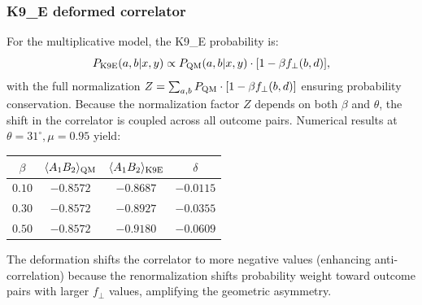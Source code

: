 \documentclass[12pt]{article}
\begin{document}
\subsubsection{K9\_E deformed correlator}
For the multiplicative model, the K9\_E probability is:
\begin{equation}
P_{\rm K9E}(a,b|x,y) \propto P_{\rm QM}(a,b|x,y) \cdot [1 - \beta f_\perp(b,d)],
\end{equation}
with the full normalization $Z = \sum_{a,b} P_{\rm QM} \cdot [1 - \beta f_\perp(b,d)]$ ensuring probability conservation. Because the normalization factor $Z$ depends on both $\beta$ and $\theta$, the shift in the correlator is coupled across all outcome pairs. Numerical results at $\theta = 31^\circ, \mu = 0.95$ yield:
\begin{center}
\begin{tabular}{cccc}
\toprule
$\beta$ & $\langle A_1 B_2 \rangle_{\rm QM}$ & $\langle A_1 B_2 \rangle_{\rm K9E}$ & $\delta$ \\
\midrule
$0.10$ & $-0.8572$ & $-0.8687$ & $-0.0115$ \\
$0.30$ & $-0.8572$ & $-0.8927$ & $-0.0355$ \\
$0.50$ & $-0.8572$ & $-0.9180$ & $-0.0609$ \\
\bottomrule
\end{tabular}
\end{center}
The deformation shifts the correlator to more negative values (enhancing anti-correlation) because the renormalization shifts probability weight toward outcome pairs with larger $f_\perp$ values, amplifying the geometric asymmetry.
\end{document}
